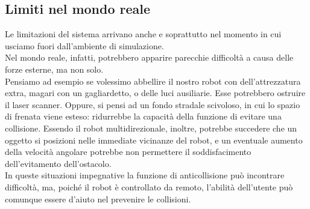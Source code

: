 \subsection{Limiti nel mondo reale}
Le limitazioni del sistema arrivano anche e soprattutto nel momento in cui usciamo fuori dall’ambiente di simulazione. \\Nel mondo reale, infatti, potrebbero apparire parecchie difficoltà a causa delle forze esterne, ma non solo. \\Pensiamo ad esempio se volessimo abbellire il nostro robot con dell’attrezzatura extra, magari con un gagliardetto, o delle luci ausiliarie. Esse potrebbero ostruire il laser scanner. Oppure, si pensi ad un fondo stradale scivoloso, in cui lo spazio di frenata viene esteso: ridurrebbe la capacità della funzione di evitare una collisione. Essendo il robot multidirezionale, inoltre, potrebbe succedere che un oggetto si posizioni nelle immediate vicinanze del robot, e un eventuale aumento della velocità angolare potrebbe non permettere il soddisfacimento dell’evitamento dell’ostacolo. \\In queste situazioni impegnative la funzione di anticollisione può incontrare difficoltà, ma, poiché il robot è controllato da remoto, l’abilità dell’utente può comunque essere d'aiuto nel prevenire le collisioni.
